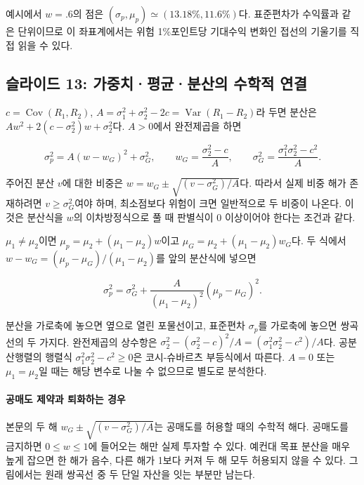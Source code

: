 \documentclass[11pt,a4paper]{article}
\begin{document}
예시에서 $w=.6$의 점은 $(\sigma_p,\mu_p)\simeq(13.18\%,11.6\%)$다. 표준편차가 수익률과 같은 단위이므로 이 좌표계에서는 위험 1\%포인트당 기대수익 변화인 접선의 기울기를 직접 읽을 수 있다.
\par

\subsection{슬라이드 13: 가중치·평균·분산의 수학적 연결}

$c=\operatorname{Cov}(R_1,R_2)$, $A=\sigma_1^2+\sigma_2^2-2c=\operatorname{Var}(R_1-R_2)$라 두면 분산은 $Aw^2+2(c-\sigma_2^2)w+\sigma_2^2$다. $A>0$에서 완전제곱을 하면
\par

\[
\sigma_p^2=A(w-w_G)^2+\sigma_G^2,\qquad
w_G=\frac{\sigma_2^2-c}{A},\qquad
\sigma_G^2=\frac{\sigma_1^2\sigma_2^2-c^2}{A}.
\]

주어진 분산 $v$에 대한 비중은 $w=w_G\pm\sqrt{(v-\sigma_G^2)/A}$다. 따라서 실제 비중 해가 존재하려면 $v\ge\sigma_G^2$여야 하며, 최소점보다 위험이 크면 일반적으로 두 비중이 나온다. 이것은 분산식을 $w$의 이차방정식으로 풀 때 판별식이 0 이상이어야 한다는 조건과 같다.
\par

$\mu_1\ne\mu_2$이면 $\mu_p=\mu_2+(\mu_1-\mu_2)w$이고 $\mu_G=\mu_2+(\mu_1-\mu_2)w_G$다. 두 식에서 $w-w_G=(\mu_p-\mu_G)/(\mu_1-\mu_2)$를 앞의 분산식에 넣으면
\par

\[
\sigma_p^2=\sigma_G^2+\frac{A}{(\mu_1-\mu_2)^2}(\mu_p-\mu_G)^2.
\]

분산을 가로축에 놓으면 옆으로 열린 포물선이고, 표준편차 $\sigma_p$를 가로축에 놓으면 쌍곡선의 두 가지다. 완전제곱의 상수항은 $\sigma_2^2-(\sigma_2^2-c)^2/A=(\sigma_1^2\sigma_2^2-c^2)/A$다. 공분산행렬의 행렬식 $\sigma_1^2\sigma_2^2-c^2\ge0$은 코시-슈바르츠 부등식에서 따른다. $A=0$ 또는 $\mu_1=\mu_2$일 때는 해당 변수로 나눌 수 없으므로 별도로 분석한다.
\par

\paragraph{공매도 제약과 퇴화하는 경우}

본문의 두 해 $w_G\pm\sqrt{(v-\sigma_G^2)/A}$는 공매도를 허용할 때의 수학적 해다. 공매도를 금지하면 $0\le w\le1$에 들어오는 해만 실제 투자할 수 있다. 예컨대 목표 분산을 매우 높게 잡으면 한 해가 음수, 다른 해가 1보다 커져 두 해 모두 허용되지 않을 수 있다. 그림에서는 원래 쌍곡선 중 두 단일 자산을 잇는 부분만 남는다.
\par
\end{document}
